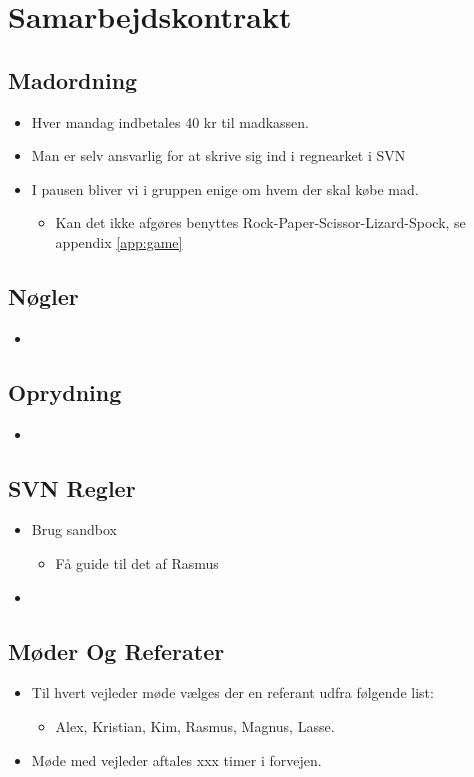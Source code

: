 \documentclass{article}
\begin{document}
\section{Samarbejdskontrakt}
\subsection{Madordning}
\begin{itemize}
	\item Hver mandag indbetales 40 kr til madkassen.
	\item Man er selv ansvarlig for at skrive sig ind i regnearket i SVN
	\item I pausen bliver vi i gruppen enige om hvem der skal købe mad.
	
\begin{itemize}
	\item Kan det ikke afgøres benyttes Rock-Paper-Scissor-Lizard-Spock, se appendix \ref{app:game}
\end{itemize}
\end{itemize}

\subsection{Nøgler}
\begin{itemize}
	\item 
\end{itemize}

\subsection{Oprydning}
\begin{itemize}
	\item 
\end{itemize}

\subsection{SVN Regler}
\begin{itemize}
	\item Brug sandbox
	\begin{itemize}
		\item Få guide til det af Rasmus
	\end{itemize}
	\item 
\end{itemize}

\subsection{Møder Og Referater}
\begin{itemize}
	\item Til hvert vejleder møde vælges der en referant udfra følgende list:
	\begin{itemize}
		\item Alex, Kristian, Kim, Rasmus, Magnus, Lasse.
	\end{itemize}
	\item Møde med vejleder aftales xxx timer i forvejen.
\end{itemize}
\end{document}
